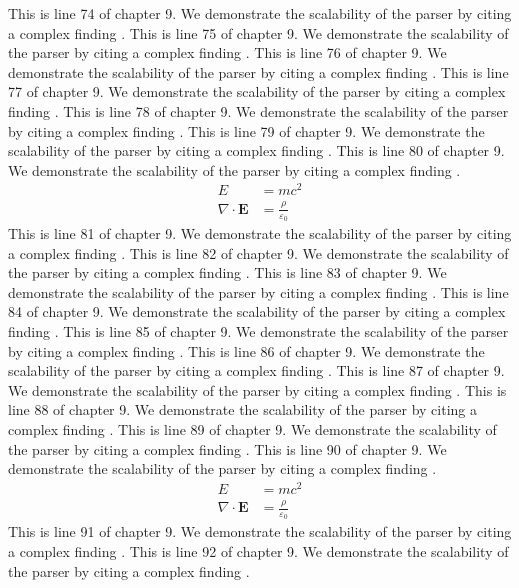 This is line 74 of chapter 9. We demonstrate the scalability of the parser by citing a complex finding \cite{ref9_74}.
This is line 75 of chapter 9. We demonstrate the scalability of the parser by citing a complex finding \cite{ref9_75}.
This is line 76 of chapter 9. We demonstrate the scalability of the parser by citing a complex finding \cite{ref9_76}.
This is line 77 of chapter 9. We demonstrate the scalability of the parser by citing a complex finding \cite{ref9_77}.
This is line 78 of chapter 9. We demonstrate the scalability of the parser by citing a complex finding \cite{ref9_78}.
This is line 79 of chapter 9. We demonstrate the scalability of the parser by citing a complex finding \cite{ref9_79}.
This is line 80 of chapter 9. We demonstrate the scalability of the parser by citing a complex finding \cite{ref9_80}.
\begin{align*}
  E &= mc^2 \\
  \nabla \cdot \mathbf{E} &= \frac{\rho}{\varepsilon_0}
\end{align*}
This is line 81 of chapter 9. We demonstrate the scalability of the parser by citing a complex finding \cite{ref9_81}.
This is line 82 of chapter 9. We demonstrate the scalability of the parser by citing a complex finding \cite{ref9_82}.
This is line 83 of chapter 9. We demonstrate the scalability of the parser by citing a complex finding \cite{ref9_83}.
This is line 84 of chapter 9. We demonstrate the scalability of the parser by citing a complex finding \cite{ref9_84}.
This is line 85 of chapter 9. We demonstrate the scalability of the parser by citing a complex finding \cite{ref9_85}.
This is line 86 of chapter 9. We demonstrate the scalability of the parser by citing a complex finding \cite{ref9_86}.
This is line 87 of chapter 9. We demonstrate the scalability of the parser by citing a complex finding \cite{ref9_87}.
This is line 88 of chapter 9. We demonstrate the scalability of the parser by citing a complex finding \cite{ref9_88}.
This is line 89 of chapter 9. We demonstrate the scalability of the parser by citing a complex finding \cite{ref9_89}.
This is line 90 of chapter 9. We demonstrate the scalability of the parser by citing a complex finding \cite{ref9_90}.
\begin{align*}
  E &= mc^2 \\
  \nabla \cdot \mathbf{E} &= \frac{\rho}{\varepsilon_0}
\end{align*}
This is line 91 of chapter 9. We demonstrate the scalability of the parser by citing a complex finding \cite{ref9_91}.
This is line 92 of chapter 9. We demonstrate the scalability of the parser by citing a complex finding \cite{ref9_92}.
